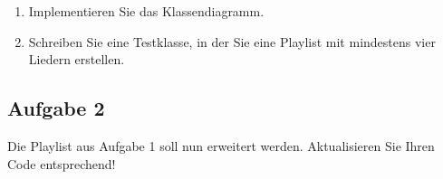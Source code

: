 \documentclass{lehramt-informatik-aufgabe}
\begin{document}
\begin{enumerate}
\item Implementieren Sie das Klassendiagramm.

\begin{liAntwort}


\end{liAntwort}

\item Schreiben Sie eine Testklasse, in der Sie eine Playlist mit
mindestens vier Liedern erstellen.

\begin{liAntwort}
\end{liAntwort}
\end{enumerate}

\subsection{Aufgabe 2}

Die Playlist aus Aufgabe 1 soll nun erweitert werden. Aktualisieren Sie
Ihren Code entsprechend!
\end{document}
